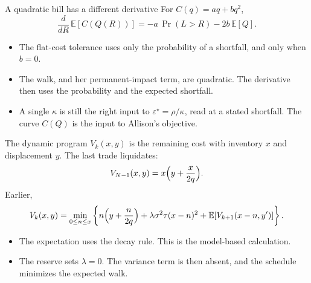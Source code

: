 \documentclass[aspectratio=169,10pt]{beamer}
\newcommand{\currentsource}{}
\newcommand{\framesource}[1]{\gdef\currentsource{#1}}
\newcommand{\aiassisted}{AI assisted, via Grok 4.7}
\begin{document}
\begin{frame}{A quadratic bill has a different derivative}
\framesource{\aiassisted}
For \(C(q)=aq+bq^{2}\),
\[
\frac{d}{dR}\,\mathbb{E}[C(Q(R))]
=-a\,\Pr(L>R)-2b\,\mathbb{E}[Q].
\]
\begin{itemize}
\item The flat-cost tolerance uses only the probability of a shortfall, and only when \(b=0\).
\item The walk, and her permanent-impact term, are quadratic. The derivative then uses the probability and the expected shortfall.
\item A single \(\kappa\) is still the right input to \(\varepsilon^{\star}=\rho/\kappa\), read at a stated shortfall. The curve \(C(Q)\) is the input to Allison's objective.
\end{itemize}
\end{frame}

\begin{frame}{The dynamic program}
\framesource{\aiassisted}
\(V_k(x,y)\) is the remaining cost with inventory \(x\) and displacement \(y\). The last trade liquidates:
\[
V_{N-1}(x,y)=x\Bigl(y+\frac{x}{2q}\Bigr).
\]
Earlier,
\[
V_k(x,y)
=\min_{0\leq n\leq x}
\left\{
n\Bigl(y+\frac{n}{2q}\Bigr)
+\lambda\sigma^{2}\tau(x-n)^{2}
+\mathbb{E}[V_{k+1}(x-n,y')]
\right\}.
\]
\begin{itemize}
\item The expectation uses the decay rule. This is the model-based calculation.
\item The reserve sets \(\lambda=0\). The variance term is then absent, and the schedule minimizes the expected walk.
\end{itemize}
\end{frame}
\end{document}
